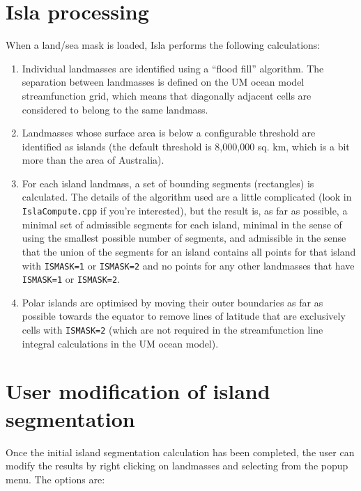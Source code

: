 \documentclass[11pt,makeidx,texhelp]{report}
\begin{document}
\section{Isla processing}

When a land/sea mask is loaded, Isla performs the following
calculations:
\begin{enumerate}
  \item{Individual landmasses are identified using a ``flood fill''
    algorithm.  The separation between landmasses is defined on the UM
    ocean model streamfunction grid, which means that diagonally
    adjacent cells are considered to belong to the same landmass.}
  \item{Landmasses whose surface area is below a configurable
    threshold are identified as islands (the default threshold is
    8,000,000 sq. km, which is a bit more than the area of
    Australia).}
  \item{For each island landmass, a set of bounding segments
    (rectangles) is calculated.  The details of the algorithm used are
    a little complicated (look in \texttt{IslaCompute.cpp} if you're
    interested), but the result is, as far as possible, a minimal set
    of admissible segments for each island, minimal in the sense of
    using the smallest possible number of segments, and admissible in
    the sense that the union of the segments for an island contains
    all points for that island with \texttt{ISMASK=1} or
    \texttt{ISMASK=2} and no points for any other landmasses that have
    \texttt{ISMASK=1} or \texttt{ISMASK=2}.}
  \item{Polar islands are optimised by moving their outer boundaries
    as far as possible towards the equator to remove lines of latitude
    that are exclusively cells with \texttt{ISMASK=2} (which are not
    required in the streamfunction line integral calculations in the
    UM ocean model).}
\end{enumerate}

\section{User modification of island segmentation}

Once the initial island segmentation calculation has been completed,
the user can modify the results by right clicking on landmasses and
selecting from the popup menu.  The options are:
\end{document}
